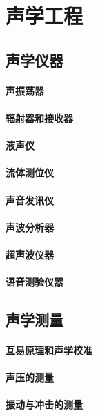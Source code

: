 \documentclass[UTF8]{../../ApplicationUniverse}
\begin{document}
\chapter{声学工程}
\section{声学仪器}
    \subsubsection{声振荡器}
    \subsubsection{辐射器和接收器}
    \subsubsection{液声仪}
    \subsubsection{流体测位仪}
    \subsubsection{声音发讯仪}
    \subsubsection{声波分析器}
    \subsubsection{超声波仪器}
    \subsubsection{语音测验仪器}
\section{声学测量}
    \subsubsection{互易原理和声学校准}
    \subsubsection{声压的测量}
    \subsubsection{振动与冲击的测量}
\end{document}
